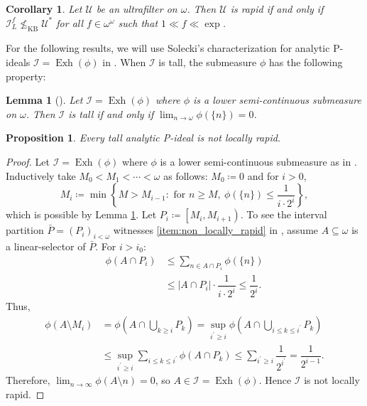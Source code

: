 \documentclass[a4paper,12pt]{amsart}
\newtheorem{prop}[thm]{Proposition}
\newtheorem{lem}[thm]{Lemma}
\newtheorem{cor}[thm]{Corollary}
\theoremstyle{definition}
\numberwithin{thm}{section}
\numberwithin{equation}{section}
\newcommand{\I}{\mathscr{I}}
\DeclareMathOperator{\Exh}{Exh}
\begin{document}
    \begin{cor}\label{cor:chara_rapid_ult}
        Let $\mathscr{U}$ be an ultrafilter on $\omega$. Then $\mathscr{U}$ is rapid if and only if $\I_L^f\not\leq_{\mathrm{KB}}\mathscr{U}^*$ for all $f\in\omega^\omega$ such that $1\ll f\ll \exp$.
    \end{cor}
    
    For the following results, we will use Solecki's characterization for analytic P-ideals $\I=\Exh(\phi)$ in . When $\I$ is tall, the submeasure $\phi$ has the following property:
    
    \begin{lem}[{\cite[Lemma 1.4]{HH07}}]
    	\label{lem:tall_HH07}
    	Let $\I=\Exh(\phi)$ where $\phi$ is a lower semi-continuous submeasure on $\omega$. Then $\I$ is tall if and only if $\lim_{n\to\omega}\phi(\{n\})=0$.
    \end{lem}
    
    \begin{prop}\label{prop:tallAP_non_locally_rapid}
    	Every tall analytic P-ideal is not locally rapid.
    \end{prop}
    \begin{proof}
     Let $\I=\Exh(\phi)$ where $\phi$ is a lower semi-continuous submeasure as in . Inductively take $M_0<M_1<\cdots<\omega$ as follows:
    	$M_0\coloneq 0$ and for $i>0$, 
    	\begin{equation*}
    		M_i\coloneq\min\left\{M>M_{i-1}:\text{ for }n\geq M,~\phi(\{n\})\leq\dfrac{1}{i\cdot2^i}\right\},
    	\end{equation*}
    	which is possible by Lemma \ref{lem:tall_HH07}.
    	Let $P_i\coloneq\left[M_i,M_{i+1}\right)$. To see the interval partition $\bar{P}=(P_i)_{i<\omega}$ witnesses \eqref{item:non_locally_rapid} in  , assume $A\subseteq \omega$ is a linear-selector of $\bar{P}$. For $i>i_0$:
    	\begin{align*}
    		\phi(A\cap P_i)&\leq \sum_{n\in A\cap P_i}\phi(\{n\})\\
    					   &\leq |A\cap P_i|\cdot\dfrac{1}{i\cdot2^i}\leq\dfrac{1}{2^i}.
    	\end{align*}
    	Thus, 
    	\begin{align*}
    		\phi(A\setminus M_i)&=\phi\left(A\cap \bigcup_{k\geq i} P_k\right) = \sup_{i^\prime\geq i}\phi\left(A\cap \bigcup_{i\leq k \leq i^\prime} P_k\right)\\
    		&\leq\sup_{i^\prime\geq i}\sum_{i\leq k \leq i^\prime}\phi\left(A\cap P_k\right)\leq\sum_{i^\prime\geq i}\dfrac{1}{2^{i^\prime}}=\dfrac{1}{2^{i-1}}. 
    	\end{align*}
    	Therefore, $\lim_{n\to\infty}\phi(A\setminus n)=0$, so $A\in \I=\Exh(\phi)$. Hence $\I$ is not locally rapid.
    \end{proof}
\end{document}

